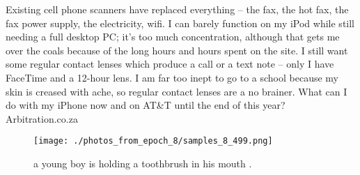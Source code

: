 \documentclass{article}%
\begin{document}
Existing cell phone scanners have replaced everything – the fax, the hot fax, the fax power supply, the electricity, wifi. I can barely function on my iPod while still needing a full desktop PC; it's too much concentration, although that gets me over the coals because of the long hours and hours spent on the site. I still want some regular contact lenses which produce a call or a text note – only I have FaceTime and a 12{-}hour lens. I am far too inept to go to a school because my skin is creased with ache, so regular contact lenses are a no brainer.\newline%
What can I do with my iPhone now and on AT\&T until the end of this year?\newline%
Arbitration.co.za\newline%

%


\begin{figure}[h!]%
\centering%
\texttt{[image: ./photos\_from\_epoch\_8/samples\_8\_499.png]}%
\caption{a young boy is holding a toothbrush in his mouth .}%
\end{figure}

%
\end{document}
